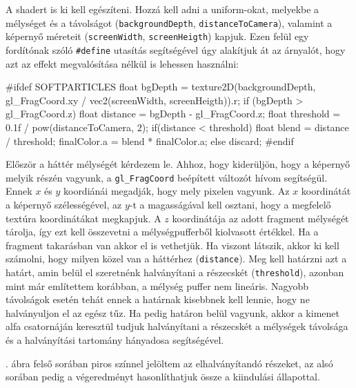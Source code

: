 A shadert is ki kell egészíteni. Hozzá kell adni a uniform-okat, melyekbe a mélységet és a távolságot (\texttt{backgroundDepth}, \texttt{distanceToCamera}), valamint a képernyő méreteit (\texttt{screenWidth}, \texttt{screenHeigth}) kapjuk. Ezen felül egy fordítónak szóló \texttt{\#define} utasítás segítségével úgy alakítjuk át az árnyalót, hogy azt az effekt megvalósítása nélkül is lehessen használni:
\begin{cpp}
#ifdef SOFTPARTICLES
float bgDepth = texture2D(backgroundDepth, 
		    gl_FragCoord.xy / vec2(screenWidth, screenHeigth)).r;
if (bgDepth > gl_FragCoord.z){
    float distance = bgDepth - gl_FragCoord.z;
    float threshold = 0.1f / pow(distanceToCamera, 2);
    if(distance < threshold)
    {
        float blend = distance / threshold;
        finalColor.a = blend * finalColor.a;
    }
}
else{
    discard;
}
#endif
\end{cpp}
Először a háttér mélységét kérdezem le. Ahhoz, hogy kiderüljön, hogy a képernyő melyik részén vagyunk, a \texttt{gl\_FragCoord} beépített változót hívom segítségül. Ennek $x$ és $y$ koordiánái megadják, hogy mely pixelen vagyunk. Az $x$ koordinátát a képernyő szélességével, az $y$-t a magasságával kell osztani, hogy a megfelelő textúra koordinátákat megkapjuk. A $z$ koordinátája az adott fragment mélységét tárolja, így ezt kell összevetni a mélységpufferből kiolvasott értékkel. Ha a fragment takarásban van akkor el is vethetjük. Ha viszont látszik, akkor ki kell számolni, hogy milyen közel van a háttérhez (\texttt{distance}). Meg kell határzni azt a határt, amin belül el szeretnénk halványítani a részecskét (\texttt{threshold}), azonban mint már említettem korábban, a mélység puffer nem lineáris. Nagyobb távolságok esetén tehát ennek a határnak kisebbnek kell lennie, hogy ne halványuljon el az egész tűz. Ha pedig határon belül vagyunk, akkor a kimenet alfa csatornáján keresztül tudjuk halványítani a részecskét a mélységek távolsága és a halványítási tartomány hányadosa segítségével.

. ábra felső sorában piros színnel jelöltem az elhalványítandó részeket, az alsó sorában pedig a végeredményt hasonlíthatjuk össze a kiindulási állapottal.

